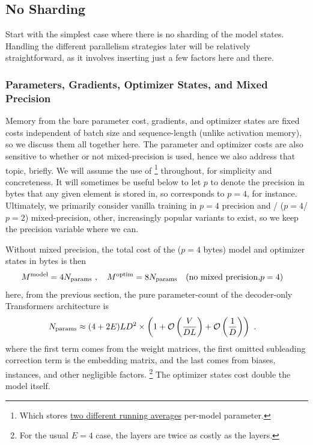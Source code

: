 \documentclass[11pt]{article}
\begin{document}
\subsection{No Sharding}

Start with the simplest case where there is no sharding of the model states. Handling the different
parallelism strategies later will be relatively straightforward, as it involves inserting just a few
factors here and there.

\subsubsection{Parameters, Gradients, Optimizer States, and Mixed Precision
\label{sec_params_grads_optim_mem}}


Memory from the bare parameter cost, gradients, and optimizer states are fixed costs independent of
batch size and sequence-length (unlike activation memory), so we discuss them all together here. The
parameter and optimizer costs are also sensitive to whether or not mixed-precision is used, hence we
also address that topic, briefly.  We will assume the use of \footnote{Which stores
    \href{https://pytorch.org/docs/stable/generated/torch.optim.Adam.html}{two different running
averages} per-model parameter.} throughout, for simplicity and concreteness. It will sometimes be
useful below to let $ p $ to denote the precision in bytes that any given element is stored in, so
 corresponds to $ p=4 $, for instance. Ultimately, we primarily consider
vanilla training in $ p=4 $ precision and / ($ p=4
$/ $ p=2 $)  mixed-precision, other, increasingly popular variants to exist, so we keep the
precision variable where we can.


Without mixed precision, the total cost of the
 ($ p=4 $ bytes) model and optimizer states in bytes is then
\begin{align}
    M ^{ \rm model} &= 4 N _{ \rm params } \ , \quad M^{ \rm  optim } = 8 N _{ \rm params }
    \quad ({\rm no \ mixed \ precision, } p=4)
    \label{eq_optimizer_states_mem_no_mp}
\end{align}
here, from the previous section, the pure parameter-count of the decoder-only Transformers
architecture is
\begin{align}
    N _{ \rm params } &\approx  (4 + 2E) L D ^{ 2 } \times \left ( 1 + \mathcal{O} \left( \frac{ V }{ DL }
    \right) + \mathcal{O} \left( \frac{ 1 }{ D } \right)  \right ) \ . \label{eq_approx_params_no_sharding}
\end{align}
where the first term comes from the  weight matrices, the first omitted
subleading correction term is the embedding matrix, and the last comes from biases,
 instances, and other negligible factors. \footnote{For the usual $ E=4 $ case,
    the  layers are twice as costly as the  layers.} The
    optimizer states cost double the model itself.
\end{document}
